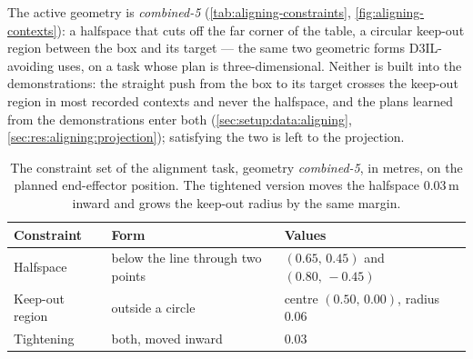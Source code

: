 The active geometry is \emph{combined-5} (\autoref{tab:aligning-constraints},
\autoref{fig:aligning-contexts}): a halfspace that cuts off the far corner of the table, a circular
keep-out region between the box and its target --- the same two geometric forms D3IL-avoiding uses, on a
task whose plan is three-dimensional. Neither is built into the demonstrations: the straight push from
the box to its target crosses the keep-out region in most recorded contexts and never the halfspace, and
the plans learned from the demonstrations enter both (\autoref{sec:setup:data:aligning},
\autoref{sec:res:aligning:projection}); satisfying the two is left to the projection.

\begin{table}[htpb]
  \caption[Constraint set of the alignment task]{The constraint set of the alignment task, geometry
  \emph{combined-5}, in metres, on the planned end-effector position. The tightened version moves the
  halfspace $0.03$\,m inward and grows the keep-out radius by the same margin.}
  \label{tab:aligning-constraints}
  \centering
  \small
  \setlength{\tabcolsep}{8pt}
  \renewcommand{\arraystretch}{1.2}
  \begin{tabularx}{\linewidth}{@{}l>{\raggedright\arraybackslash}p{3.9cm} X@{}}
    \toprule
    Constraint & Form & Values \\
    \midrule
    Halfspace & below the line through two points & $(0.65,\,0.45)$ and $(0.80,\,-0.45)$ \\
    Keep-out region & outside a circle & centre $(0.50,\,0.00)$, radius $0.06$ \\
    Tightening & both, moved inward & $0.03$ \\
    \bottomrule
  \end{tabularx}
\end{table}



